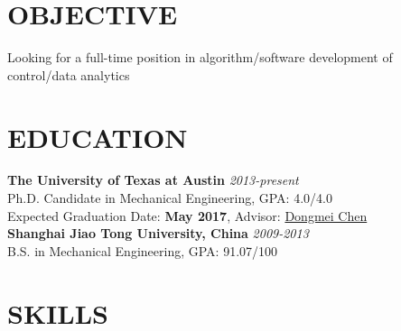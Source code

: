 \documentclass[margin, 9pt]{res} %
\begin{document}
\begin{resume}


\vspace*{-5pt}


\section{OBJECTIVE}
Looking for a full-time position in algorithm/software development of control/data analytics


\vspace*{-10pt}
\section{EDUCATION}

\textbf{The University of Texas at Austin} \hfill\textit{2013-present}\\
Ph.D. Candidate in Mechanical Engineering, GPA: 4.0/4.0\\
Expected Graduation Date: \textbf{May 2017},  Advisor: \href{http://www.me.utexas.edu/~apscl/people.html}{Dongmei Chen}\\

\vspace*{-10pt}
\textbf{Shanghai Jiao Tong University, China} \hfill\textit{2009-2013}\\
B.S. in Mechanical Engineering, GPA: 91.07/100\\

\vspace*{-10pt}
\section{SKILLS}


\end{resume}
\end{document}
